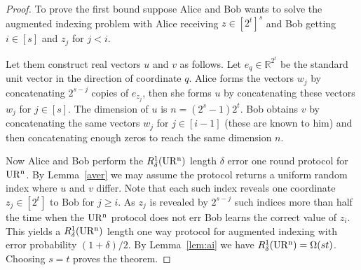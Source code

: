 \begin{proof}
To prove the first bound suppose Alice and Bob wants to
solve the augmented indexing problem with Alice receiving $z\in[2^t]^s$ and Bob
getting $i\in [s]$ and $z_j$ for $j<i$.

Let them construct real vectors $u$ and
$v$ as follows. Let $e_q\in\mathbb R^{2^t}$
be the standard unit vector in the direction of coordinate $q$. Alice forms
the vectors $w_j$ by concatenating $2^{s-j}$ copies of $e_{z_j}$, then she
forms $u$ by concatenating these vectors $w_j$ for
$j\in[s]$. The dimension of $u$ is $n=(2^s-1)2^t$. Bob
obtains $v$ by concatenating the same vectors $w_j$ for $j\in[i-1]$ (these are
known to him) and then
concatenating enough zeros to reach the same dimension
$n$.

Now Alice and Bob perform the $R^1_\delta(\operatorname{UR^n})$ length
$\delta$ error one round protocol for $\operatorname{UR^n}$. By Lemma~\ref{aver} we
may assume the protocol returns a uniform random index where $u$ and $v$
differ. Note that each such index reveals one coordinate $z_j\in[2^t]$ to Bob
for $j\ge i$. As $z_j$ is revealed by $2^{s-j}$ such indices more than half the
time when the $\operatorname{UR^n}$ protocol does not err Bob learns the correct value of
$z_i$. This yields a $R^1_\delta(\operatorname{UR^n})$ length one way protocol for augmented
indexing with error probability $(1+\delta)/2$. By Lemma~\ref{lem:ai} we have
$R^1_\delta(\operatorname{UR^n})=\Omega(st)$. Choosing $s=t$ proves the theorem.
\end{proof}

